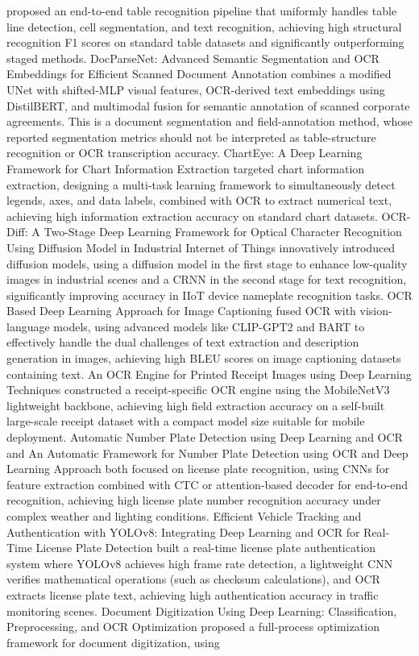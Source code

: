\cite{chen2023tcocr} proposed an end-to-end table recognition pipeline that uniformly handles table line detection, cell segmentation, and text recognition, achieving high structural recognition F1 scores on standard table datasets and significantly outperforming staged methods. DocParseNet: Advanced Semantic Segmentation and OCR Embeddings for Efficient Scanned Document Annotation \cite{liu2023docparsenet} combines a modified UNet with shifted-MLP visual features, OCR-derived text embeddings using DistilBERT, and multimodal fusion for semantic annotation of scanned corporate agreements. This is a document segmentation and field-annotation method, whose reported segmentation metrics should not be interpreted as table-structure recognition or OCR transcription accuracy. ChartEye: A Deep Learning Framework for Chart Information Extraction \cite{kim2023charteye} targeted chart information extraction, designing a multi-task learning framework to simultaneously detect legends, axes, and data labels, combined with OCR to extract numerical text, achieving high information extraction accuracy on standard chart datasets. OCR-Diff: A Two-Stage Deep Learning Framework for Optical Character Recognition Using Diffusion Model in Industrial Internet of Things \cite{park2024ocrdiff} innovatively introduced diffusion models, using a diffusion model in the first stage to enhance low-quality images in industrial scenes and a CRNN in the second stage for text recognition, significantly improving accuracy in IIoT device nameplate recognition tasks. OCR Based Deep Learning Approach for Image Captioning \cite{rahman2023ocrcaption} fused OCR with vision-language models, using advanced models like CLIP-GPT2 and BART to effectively handle the dual challenges of text extraction and description generation in images, achieving high BLEU scores on image captioning datasets containing text. An OCR Engine for Printed Receipt Images using Deep Learning Techniques \cite{nguyen2023receipt} constructed a receipt-specific OCR engine using the MobileNetV3 lightweight backbone, achieving high field extraction accuracy on a self-built large-scale receipt dataset with a compact model size suitable for mobile deployment. Automatic Number Plate Detection using Deep Learning and OCR \cite{sharma2023plate} and An Automatic Framework for Number Plate Detection using OCR and Deep Learning Approach \cite{kumar2023plateframework} both focused on license plate recognition, using CNNs for feature extraction combined with CTC or attention-based decoder for end-to-end recognition, achieving high license plate number recognition accuracy under complex weather and lighting conditions. Efficient Vehicle Tracking and Authentication with YOLOv8: Integrating Deep Learning and OCR for Real-Time License Plate Detection \cite{singh2024yolov8plate} built a real-time license plate authentication system where YOLOv8 achieves high frame rate detection, a lightweight CNN verifies mathematical operations (such as checksum calculations), and OCR extracts license plate text, achieving high authentication accuracy in traffic monitoring scenes. Document Digitization Using Deep Learning: Classification, Preprocessing, and OCR Optimization \cite{patel2024digitization} proposed a full-process optimization framework for document digitization, using 